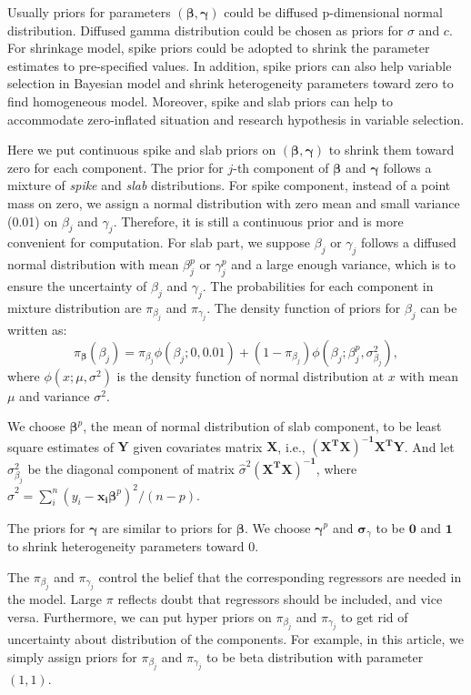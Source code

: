 \documentclass[12pt]{article}
\begin{document}
Usually priors for parameters $(\bm{\beta}, \bm{\gamma})$ could be
diffused p-dimensional normal distribution. Diffused gamma
distribution could be chosen as priors for $\sigma$ and $c$. For
shrinkage model, spike priors could be adopted to shrink the parameter
estimates to pre-specified values. In addition, spike priors can also
help variable selection in Bayesian model and shrink heterogeneity
parameters toward zero to find homogeneous model. Moreover, spike and
slab priors can help to accommodate zero-inflated situation and
research hypothesis in variable selection.

Here we put continuous spike and slab priors on $(\bm \beta, \bm
\gamma)$ to shrink them toward zero for each component. The prior for
$j$-th component of $\bm \beta$ and $\bm \gamma$ follows a mixture of
\textit{spike} and \textit{slab} distributions. For spike component,
instead of a point mass on zero, we assign a normal distribution with
zero mean and small variance (0.01) on $\beta_j$ and $\gamma_j$.
Therefore, it is still a continuous prior and is more convenient for
computation.  For slab part, we suppose $\beta_j$ or $\gamma_j$
follows a diffused normal distribution with mean $\beta_j^p$ or
$\gamma_j^p$ and a large enough variance, which is to ensure the
uncertainty of $\beta_j$ and $\gamma_j$.  The probabilities for each
component in mixture distribution are $\pi_{\beta_j}$ and
$\pi_{\gamma_j}$. The density function of priors for $\beta_j$ can be
written as:
\begin{equation*}
  \pi_{\bm \beta} (\beta_j) = \pi_{\beta_j} \phi(\beta_j; 0, 0.01) +
  (1- \pi_{\beta_j}) \phi(\beta_j; \beta_j^p, \sigma_{\beta_j}^2),
\end{equation*}
where $\phi(x; \mu, \sigma^2)$ is the density function of normal
distribution at $x$ with mean $\mu$ and variance $\sigma^2$.

We choose $\bm \beta^p$, the mean of normal distribution of slab
component, to be least square estimates of $\bm Y$ given covariates
matrix $\bm X$, i.e., $\bm{(X^TX)^{-1}X^TY}$. And let
$\sigma_{\beta_j}^2$ be the diagonal component of matrix
$\hat{\sigma}^2 \bm{(X^TX)^{-1}}$, where $\hat{\sigma}^2 = \sum_i^n
(y_i - \bm{x_i\beta}^p)^2/(n - p)$.

The priors for $\bm \gamma$ are similar to priors for $\bm \beta$. We
choose $\bm \gamma^p$ and $\bm \sigma_{\gamma}$ to be $\bm 0$ and $\bm
1$ to shrink heterogeneity parameters toward 0.

The $\pi_{\beta_j}$ and $\pi_{\gamma_j}$ control the belief that the
corresponding regressors are needed in the model. Large $\pi$ reflects
doubt that regressors should be included, and vice versa. Furthermore,
we can put hyper priors on $\pi_{\beta_j}$ and $\pi_{\gamma_j}$ to get
rid of uncertainty about distribution of the components.  For example,
in this article, we simply assign priors for $\pi_{\beta_j}$ and
$\pi_{\gamma_j}$ to be beta distribution with parameter $(1,1)$.
\end{document}
